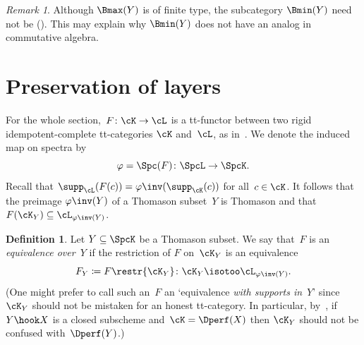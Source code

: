\documentclass[11pt]{amsart}
\numberwithin{equation}{section} %
\theoremstyle{plain}
\theoremstyle{definition}
\newtheorem{dfn}[equation]{Definition}
\theoremstyle{remark}
\newtheorem{rem}[equation]{Remark}
\begin{document}
%
\begin{rem}
Although $\Bmax(Y)$ is of finite type, the subcategory $\Bmin(Y)$ need not be (). This may explain why $\Bmin(Y)$ does not have an analog in commutative algebra.
\end{rem}

\section{Preservation of layers}
\label{sec:Y-invariance}%

For the whole section,~$F\colon \cK\to \cL$ is a tt-functor between two rigid idempotent-complete tt-categories $\cK$ and~$\cL$, as in~. We denote the induced map on spectra by
%
\begin{equation*}
\varphi=\Spc(F)\colon \SpcL\to \SpcK.
\end{equation*}
%
Recall that $\supp_{\cL}(F(c))=\varphi\inv(\supp_{\cK}(c))$ for all~$c\in\cK$.
It follows that the preimage $\varphi\inv(Y)$ of a Thomason subset~$Y$ is Thomason and that $F(\cK_Y)\subseteq \cL_{\varphi\inv(Y)}$.

%
\begin{dfn}
\label{dfn:Y-equivalence}%
Let $Y\subseteq\SpcK$ be a Thomason subset. We say that~$F$ is an \emph{equivalence over~$Y$} if the restriction of $F$ on~$\cK_Y$ is an equivalence
%
\begin{equation*}
F_Y\coloneq F\restr{\cK_Y}\colon \cK_Y\isotoo \cL_{\varphi\inv(Y)}.
\end{equation*}
%
(One might prefer to call such an~$F$ an `equivalence \emph{with supports in}~$Y$' since $\cK_Y$ should not be mistaken for an honest tt-category.
In particular, by~, if~$Y\hook X$ is a closed subscheme and~$\cK=\Dperf(X)$ then $\cK_Y$ should not be confused with~$\Dperf(Y)$.)
\end{dfn}
\end{document}
